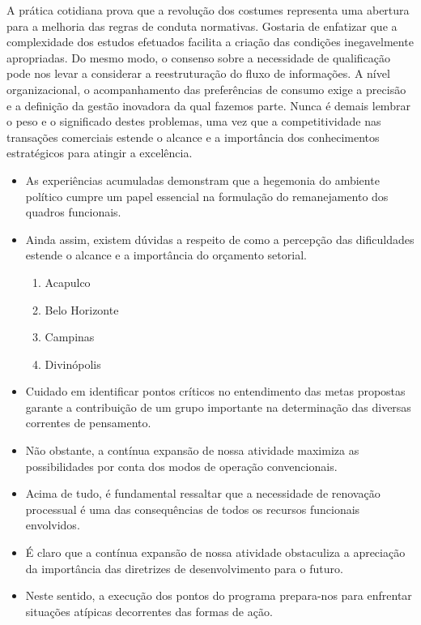 \documentclass[fleqn]{icat-ufal}
\begin{document}
A prática cotidiana prova que a revolução dos costumes representa uma abertura
para a melhoria das regras de conduta normativas. Gostaria de enfatizar que a
complexidade dos estudos efetuados facilita a criação das condições
inegavelmente apropriadas. Do mesmo modo, o consenso sobre a necessidade de
qualificação pode nos levar a considerar a reestruturação do fluxo de
informações. A nível organizacional, o acompanhamento das preferências de
consumo exige a precisão e a definição da gestão inovadora da qual fazemos
parte. Nunca é demais lembrar o peso e o significado destes problemas, uma vez
que a competitividade nas transações comerciais estende o alcance e a
importância dos conhecimentos estratégicos para atingir a excelência. 

\begin{itemize}
    
    \item As experiências acumuladas demonstram que a hegemonia do ambiente político
    cumpre um papel essencial na formulação do remanejamento dos quadros funcionais.
    
    \item Ainda assim, existem dúvidas a respeito de como a percepção das
    dificuldades estende o alcance e a importância do orçamento setorial.
    \begin{enumerate}
        \item Acapulco
        \item Belo Horizonte
        \item Campinas
        \item Divinópolis
    \end{enumerate}
    
    \item Cuidado em identificar pontos críticos no entendimento das metas
    propostas garante a contribuição de um grupo importante na determinação das
    diversas correntes de pensamento.
    
    \item Não obstante, a contínua expansão de nossa atividade maximiza as
    possibilidades por conta dos modos de operação convencionais.
    
    \item Acima de tudo, é fundamental ressaltar que a necessidade de renovação
    processual é uma das consequências de todos os recursos funcionais envolvidos.
    
    \item É claro que a contínua expansão de nossa atividade obstaculiza a apreciação
    da importância das diretrizes de desenvolvimento para o futuro.
    
    \item Neste sentido, a execução dos pontos do programa prepara-nos para enfrentar
    situações atípicas decorrentes das formas de ação. 
    
\end{itemize}
\end{document}
